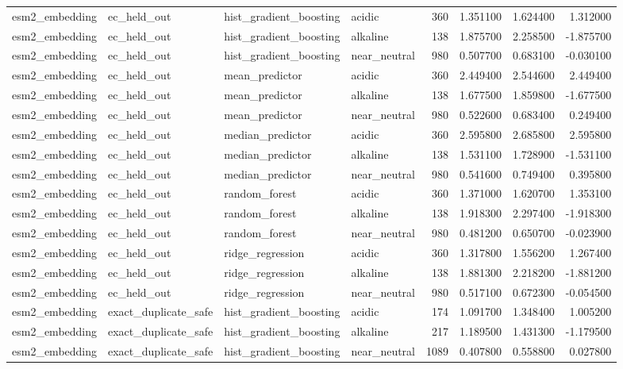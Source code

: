 \begin{longtable}{llllrrrr}
esm2\_embedding & ec\_held\_out & hist\_gradient\_boosting & acidic & 360 & 1.351100 & 1.624400 & 1.312000 \\
esm2\_embedding & ec\_held\_out & hist\_gradient\_boosting & alkaline & 138 & 1.875700 & 2.258500 & -1.875700 \\
esm2\_embedding & ec\_held\_out & hist\_gradient\_boosting & near\_neutral & 980 & 0.507700 & 0.683100 & -0.030100 \\
esm2\_embedding & ec\_held\_out & mean\_predictor & acidic & 360 & 2.449400 & 2.544600 & 2.449400 \\
esm2\_embedding & ec\_held\_out & mean\_predictor & alkaline & 138 & 1.677500 & 1.859800 & -1.677500 \\
esm2\_embedding & ec\_held\_out & mean\_predictor & near\_neutral & 980 & 0.522600 & 0.683400 & 0.249400 \\
esm2\_embedding & ec\_held\_out & median\_predictor & acidic & 360 & 2.595800 & 2.685800 & 2.595800 \\
esm2\_embedding & ec\_held\_out & median\_predictor & alkaline & 138 & 1.531100 & 1.728900 & -1.531100 \\
esm2\_embedding & ec\_held\_out & median\_predictor & near\_neutral & 980 & 0.541600 & 0.749400 & 0.395800 \\
esm2\_embedding & ec\_held\_out & random\_forest & acidic & 360 & 1.371000 & 1.620700 & 1.353100 \\
esm2\_embedding & ec\_held\_out & random\_forest & alkaline & 138 & 1.918300 & 2.297400 & -1.918300 \\
esm2\_embedding & ec\_held\_out & random\_forest & near\_neutral & 980 & 0.481200 & 0.650700 & -0.023900 \\
esm2\_embedding & ec\_held\_out & ridge\_regression & acidic & 360 & 1.317800 & 1.556200 & 1.267400 \\
esm2\_embedding & ec\_held\_out & ridge\_regression & alkaline & 138 & 1.881300 & 2.218200 & -1.881200 \\
esm2\_embedding & ec\_held\_out & ridge\_regression & near\_neutral & 980 & 0.517100 & 0.672300 & -0.054500 \\
esm2\_embedding & exact\_duplicate\_safe & hist\_gradient\_boosting & acidic & 174 & 1.091700 & 1.348400 & 1.005200 \\
esm2\_embedding & exact\_duplicate\_safe & hist\_gradient\_boosting & alkaline & 217 & 1.189500 & 1.431300 & -1.179500 \\
esm2\_embedding & exact\_duplicate\_safe & hist\_gradient\_boosting & near\_neutral & 1089 & 0.407800 & 0.558800 & 0.027800 \\

\end{longtable}
